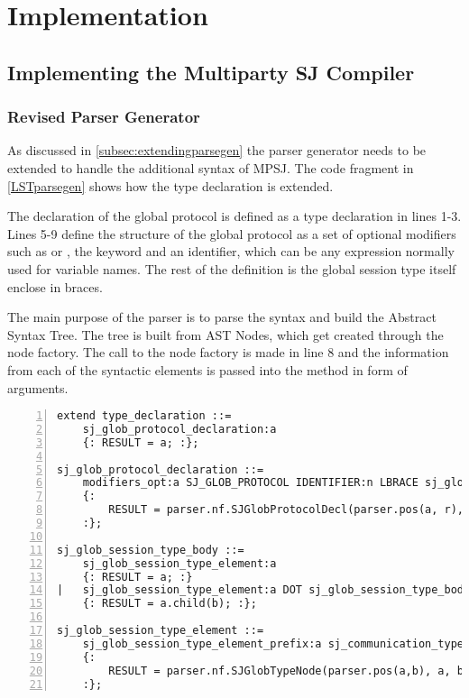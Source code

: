 \cleardoublepage
\chapter{Implementation}
\label{ch:implementation}

\section{Implementing the Multiparty SJ Compiler}

\subsection{Revised Parser Generator}
\label{subsec:ppgimpl}

As discussed in \autoref{subsec:extendingparsegen} the parser generator needs to be extended to handle the additional syntax of MPSJ. The code fragment in \autoref{LSTparsegen} shows how the type declaration is extended. 

The declaration of the global protocol is defined as a type declaration in lines 1-3. Lines 5-9 define the structure of the global protocol as a set of optional modifiers such as  or , the  keyword and an identifier, which can be any expression normally used for variable names. The rest of the definition is the global session type itself enclose in braces. 

The main purpose of the parser is to parse the syntax and build the Abstract Syntax Tree. The tree is built from AST Nodes, which get created through the node factory. The call to the node factory is made in line 8 and the information from each of the syntactic elements is passed into the method in form of arguments.  

\begin{lstlisting}[htb, basicstyle=\LISTINGSTYLE, numbers=left, caption={Example code fragment showing the language extension to the parser generator}, label={LSTparsegen}]
extend type_declaration ::=
	sj_glob_protocol_declaration:a
	{: RESULT = a; :};

sj_glob_protocol_declaration ::=
	modifiers_opt:a SJ_GLOB_PROTOCOL IDENTIFIER:n LBRACE sj_glob_session_type_body:t RBRACE:r
	{: 
		RESULT = parser.nf.SJGlobProtocolDecl(parser.pos(a, r), a, parser.nf.Id(parser.pos(n), n.getIdentifier()), t); 
	:};

sj_glob_session_type_body ::= 
	sj_glob_session_type_element:a
	{: RESULT = a; :}
|	sj_glob_session_type_element:a DOT sj_glob_session_type_body:b
	{: RESULT = a.child(b); :};

sj_glob_session_type_element ::=
	sj_glob_session_type_element_prefix:a sj_communication_type_elem:b
	{: 
		RESULT = parser.nf.SJGlobTypeNode(parser.pos(a,b), a, b); 
	:};	
\end{lstlisting}

